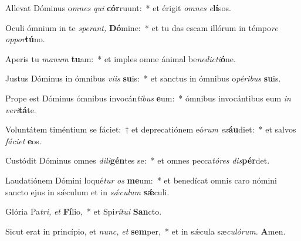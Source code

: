 \item Allevat Dóminus o\textit{mnes} \textit{qui} \textbf{cór}ruunt:~* et érigit \textit{omnes} \textit{e}\textbf{lí}sos.
\item Oculi ó\-mnium in te \textit{sperant,} \textbf{Dó}mine:~* et tu das escam illórum in témpo\textit{re} \textit{oppor}\textbf{tú}no.
\item Aperis tu \textit{manum} \textbf{tu}am:~* et imples omne ánimal be\tinyhspace\textit{nedicti}\textbf{ó}ne.
\item Justus Dóminus in ómnibus \textit{viis} \textbf{su}is:~* et san\-ctus in ómnibus o\textit{péribus} \textbf{su}is.
\item Prope est Dóminus ómnibus invocán\textit{tibus} \textbf{e}um:~* ómnibus invocántibus eum \textit{in} \textit{veri}\textbf{tá}te.
\item Voluntátem timéntium se fáciet:~† et deprecatiónem eó\textit{rum} \textit{ex}\textbf{áu}diet:~* et salvos \textit{fáciet} \textbf{e}os.
\item Custódit Dóminus omnes \textit{dili}\textbf{gén}tes se:~* et omnes pecca\tinyhspace\textit{tóres} \textit{dis}\textbf{pér}det.
\item Laudatiónem Dómini loqué\tinyhspace\textit{tur} \textit{os} \textbf{me}um:~* et benedícat omnis caro nómini sancto ejus in sǽculum et in \textit{sǽculum} \textbf{sǽ}culi.
\item Glória Pa\tinyhspace\textit{tri,} \textit{et} \textbf{Fí}lio,~* et Spi\tinyhspace\textit{rítui} \textbf{San}cto.
\item Sicut erat in princípio, et \textit{nunc,} \textit{et} \textbf{sem}per,~* et in sǽcula sæ\tinyhspace\textit{culórum.} \textbf{A}men.